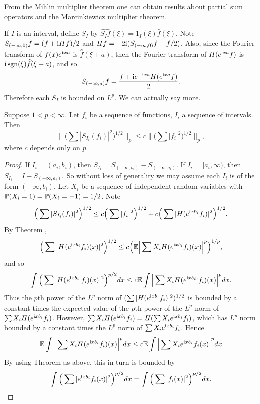 
From the Mihlin multiplier theorem one can obtain results about partial sum operators and the Marcinkiewicz multiplier theorem.

If $I$ is an interval, define $S_I$ by $\widehat{S_If}(\xi) = 1_I(\xi)\widehat{f}(\xi)$. Note $S_{(-\infty,0)}f = (f+\im Hf)/2$ and $Hf = -2\im (S_{(-\infty,0)}f - f/2)$. Also, since the Fourier transform of $f(x)e^{\im xa}$ is $\widehat{f}(\xi+a)$, then the Fourier transform of $H(e^{\im xa}f)$ is $\im\sgn(\xi)\widehat{f}(\xi+a)$, and so
\begin{equation}\label{eq:ch4_5.14}
    S_{(-\infty,a)}f = \frac{f + \im e^{-\im xa}H(e^{\im xa}f)}{2}.
\end{equation}
Therefore each $S_I$ is bounded on $L^p$. We can actually say more.

\begin{proposition}\label{prop:ch4_5.6}
Suppose $1 < p < \infty$. Let $f_i$ be a sequence of functions, $I_i$ a sequence of intervals. Then
\[
    \Big\|\Big(\sum|S_{I_i}(f_i)|^2\Big)^{1/2}\Big\|_p \leq c\Big\|\Big(\sum|f_i|^2\Big)^{1/2}\Big\|_p,
\]
where $c$ depends only on $p$.
\end{proposition}

\begin{proof}
If $I_i = (a_i,b_i)$, then $S_{I_i} = S_{(-\infty,b_i)} - S_{(-\infty,a_i)}$. If $I_i = [a_i,\infty)$, then $S_{I_i} = I - S_{(-\infty,a_i)}$. So without loss of generality we may assume each $I_i$ is of the form $(-\infty,b_i)$. Let $X_i$ be a sequence of independent random variables with $\P(X_i = 1) = \P(X_i = -1) = 1/2$. Note
\[
    \Big(\sum|S_{I_i}(f_i)|^2\Big)^{1/2} \leq c\Big(\sum|f_i|^2\Big)^{1/2} + c\Big(\sum|H(e^{\im xb_i}f_i)|^2\Big)^{1/2}.
\]
By Theorem ,
\[
    \Big(\sum|H(e^{\im xb_i}f_i)(x)|^2\Big)^{1/2} \leq c\Big(\E\Big|\sum X_iH(e^{\im xb_i}f_i)(x)\Big|^p\Big)^{1/p},
\]
and so
\mpagebreak
\[
    \int\Big(\sum|H(e^{\im xb_i\cdot}f_i)(x)|^2\Big)^{p/2}dx \leq c\E\int\Big|\sum X_iH(e^{\im xb_i\cdot}f_i)(x)\Big|^pdx.
\]
Thus the $p$th power of the $L^p$ norm of $(\sum|H(e^{\im xb_i}f_i)|^2)^{1/2}$ is bounded by a constant times the expected value of the $p$th power of the $L^p$ norm of $\sum X_iH(e^{\im xb_i}f_i)$. However, $\sum X_iH(e^{\im xb_i}f_i)=H(\sum X_i e^{\im x b_i}f_i)$, which has $L^p$ norm bounded by a constant times the $L^p$ norm of $\sum X_i e^{\im x b_i}f_i$. Hence
\[
    \E\int\Big|\sum X_iH(e^{\im xb_i}f_i)(x)\Big|^pdx \leq c\E\int\Big|\sum X_i e^{\im xb_i}f_i(x)\Big|^pdx
\]
By using Theorem  as above, this in turn is bounded by
\[
    \int\Big(\sum|e^{\im xb_i}f_i(x)|^2\Big)^{p/2}dx = \int\Big(\sum|f_i(x)|^2\Big)^{p/2}dx.
\]
\end{proof}

